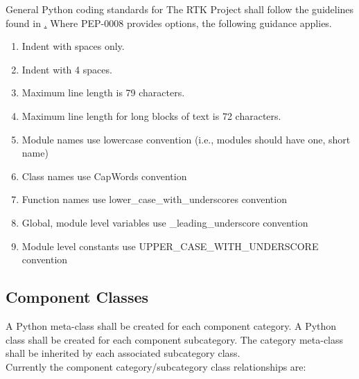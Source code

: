\documentclass[11pt, 12pt, twoside, onecolumn]{article}
\begin{document}
\noindent General Python coding standards for The RTK Project shall follow the guidelines found in \href{http://www.python.org/dev/peps/pep-0008/ PEP-0008}.  Where PEP-0008 provides options, the following guidance applies.

\begin{enumerate}
    \item Indent with spaces only.
    \item Indent with 4 spaces.
    \item Maximum line length is 79 characters.
    \item Maximum line length for long blocks of text is 72 characters.
    \item Module names use lowercase convention (i.e., modules should have one, short name)
    \item Class names use CapWords convention
    \item Function names use lower\_case\_with\_underscores convention
    \item Global, module level variables use \_leading\_underscore convention
    \item Module level constants use UPPER\_CASE\_WITH\_UNDERSCORE convention
\end{enumerate}

\subsection{\bf \large Component Classes}

\noindent A Python meta-class shall be created for each component category.  A Python class shall be created for each component subcategory.  The category meta-class shall be inherited by each associated subcategory class. \\

\noindent Currently the component category/subcategory class relationships are: \\
\end{document}

